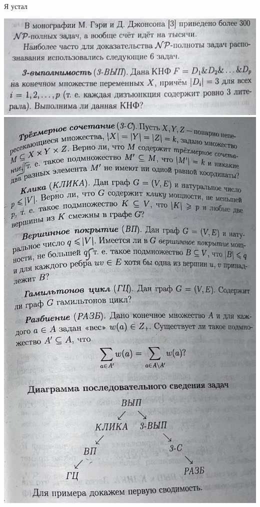 \newpage

\begin{note}
    Я устал

    \includegraphics[scale=0.1]{../figures/need2.png}
    \includegraphics[scale=0.1]{../figures/need1.png}
\end{note}